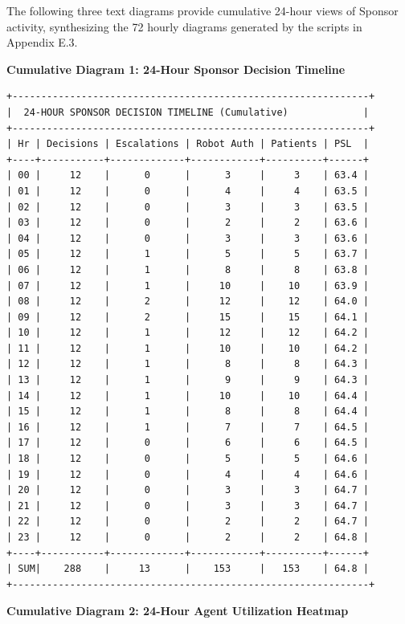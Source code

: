 The following three text diagrams provide cumulative 24-hour views of Sponsor activity,
synthesizing the 72 hourly diagrams generated by the scripts in Appendix E.3.

\textbf{Cumulative Diagram 1: 24-Hour Sponsor Decision Timeline}

\begin{verbatim}
+--------------------------------------------------------------+
|  24-HOUR SPONSOR DECISION TIMELINE (Cumulative)             |
+--------------------------------------------------------------+
| Hr | Decisions | Escalations | Robot Auth | Patients | PSL  |
+----+-----------+-------------+------------+----------+------+
| 00 |     12    |      0      |      3     |     3    | 63.4 |
| 01 |     12    |      0      |      4     |     4    | 63.5 |
| 02 |     12    |      0      |      3     |     3    | 63.5 |
| 03 |     12    |      0      |      2     |     2    | 63.6 |
| 04 |     12    |      0      |      3     |     3    | 63.6 |
| 05 |     12    |      1      |      5     |     5    | 63.7 |
| 06 |     12    |      1      |      8     |     8    | 63.8 |
| 07 |     12    |      1      |     10     |    10    | 63.9 |
| 08 |     12    |      2      |     12     |    12    | 64.0 |
| 09 |     12    |      2      |     15     |    15    | 64.1 |
| 10 |     12    |      1      |     12     |    12    | 64.2 |
| 11 |     12    |      1      |     10     |    10    | 64.2 |
| 12 |     12    |      1      |      8     |     8    | 64.3 |
| 13 |     12    |      1      |      9     |     9    | 64.3 |
| 14 |     12    |      1      |     10     |    10    | 64.4 |
| 15 |     12    |      1      |      8     |     8    | 64.4 |
| 16 |     12    |      1      |      7     |     7    | 64.5 |
| 17 |     12    |      0      |      6     |     6    | 64.5 |
| 18 |     12    |      0      |      5     |     5    | 64.6 |
| 19 |     12    |      0      |      4     |     4    | 64.6 |
| 20 |     12    |      0      |      3     |     3    | 64.7 |
| 21 |     12    |      0      |      3     |     3    | 64.7 |
| 22 |     12    |      0      |      2     |     2    | 64.7 |
| 23 |     12    |      0      |      2     |     2    | 64.8 |
+----+-----------+-------------+------------+----------+------+
| SUM|    288    |     13      |    153     |   153    | 64.8 |
+--------------------------------------------------------------+
\end{verbatim}

\textbf{Cumulative Diagram 2: 24-Hour Agent Utilization Heatmap}

